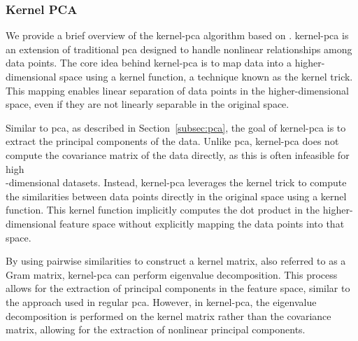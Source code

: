 \subsubsection{Kernel PCA}
We provide a brief overview of the \gls{kernel-pca} algorithm based on \citet{learningwithkernels}.
\gls{kernel-pca} is an extension of traditional \gls{pca} designed to handle nonlinear relationships among data points.
The core idea behind \gls{kernel-pca} is to map data into a higher-dimensional space using a kernel function, a technique known as the kernel trick.
This mapping enables linear separation of data points in the higher-dimensional space, even if they are not linearly separable in the original space.

Similar to \gls{pca}, as described in Section~\ref{subsec:pca}, the goal of \gls{kernel-pca} is to extract the principal components of the data.
Unlike \gls{pca}, \gls{kernel-pca} does not compute the covariance matrix of the data directly, as this is often infeasible for high\\-dimensional datasets.
Instead, \gls{kernel-pca} leverages the kernel trick to compute the similarities between data points directly in the original space using a kernel function.
This kernel function implicitly computes the dot product in the higher-dimensional feature space without explicitly mapping the data points into that space.

By using pairwise similarities to construct a kernel matrix, also referred to as a Gram matrix, \gls{kernel-pca} can perform eigenvalue decomposition.
This process allows for the extraction of principal components in the feature space, similar to the approach used in regular \gls{pca}.
However, in \gls{kernel-pca}, the eigenvalue decomposition is performed on the kernel matrix rather than the covariance matrix, allowing for the extraction of nonlinear principal components.